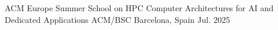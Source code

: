 

\begin{cvhonors}

  \cvhonor
  	{ACM Europe Summer School on HPC Computer Architectures for AI and Dedicated Applications}
  	{ACM/BSC}
  	{Barcelona, Spain}
  	{Jul. 2025}


\end{cvhonors}








